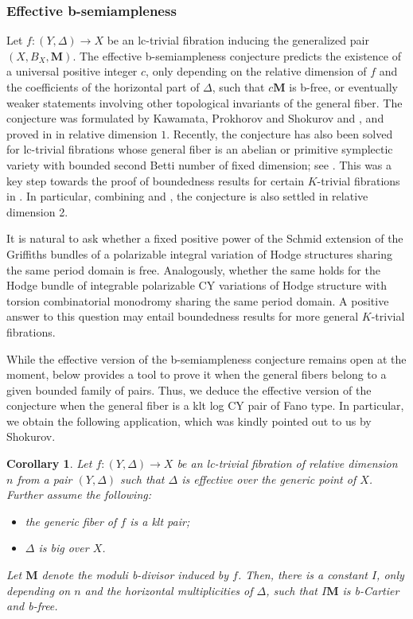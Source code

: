\documentclass{amsart}
\newtheorem{cor}[theorem]{Corollary}
\theoremstyle{definition}
\theoremstyle{remark}
\newcommand\bfM{{\bf M}}
\def\bfM{\mathbf{M}}
\numberwithin{equation}{section}
\begin{document}
\subsubsection{Effective  b-semiampleness}
Let $f \colon (Y, \Delta) \to X$ be an lc-trivial fibration inducing the generalized pair $(X, B_{X}, \bfM)$. The effective  b-semiampleness conjecture predicts the existence of a universal positive integer $c$, only depending on the relative dimension of $f$ and the coefficients of the horizontal part of $\Delta$, such that $c \bfM$ is  b-free, or eventually weaker statements involving other topological invariants of the general fiber. The conjecture was formulated by Kawamata, Prokhorov and Shokurov  \cite[Conj 1]{AmbroPhD} and \cite[Conj.~7.13.1]{PS09}, and proved in \cite[Cor.~8.15]{PS09} in relative dimension $1$.
Recently, the conjecture has also been solved for lc-trivial fibrations whose general fiber is an abelian or primitive symplectic variety with bounded second Betti number of fixed dimension; see \cite[Thm.~C]{EFGMS2025}. This was a key step towards the proof of boundedness results for certain $K$-trivial fibrations in \cite{EFGMS2025}.
In particular, combining \cite{EFGMS2025} and \cite[Thm.~1.4]{babwild}, the conjecture is also settled in relative dimension 2.

It is natural to ask whether a fixed positive power of the Schmid extension of the Griffiths bundles of a polarizable integral variation of Hodge structures sharing the same period domain is free. Analogously, whether the same holds for the Hodge bundle of integrable polarizable CY variations of Hodge structure with torsion combinatorial monodromy sharing the same period domain. A positive answer to this question may entail boundedness results for more general $K$-trivial fibrations.

While the effective version of the b-semiampleness conjecture remains open at the moment,
 below provides a tool to prove it when the general fibers belong to a given bounded family of pairs.
Thus, we deduce the effective version of the conjecture when the general fiber is a klt log CY pair of Fano type.
In particular, we obtain the following application, which was kindly pointed out to us by Shokurov.
\begin{cor}\label{cor:effective_b_semiampleness_fano}
Let $f \colon (Y,\Delta)\to X$ be an lc-trivial fibration of relative dimension $n$ from a pair $(Y,\Delta)$
such that $\Delta$ is effective over the generic point of $X$.
Further assume the following:
\begin{itemize}
    \item[(i)] the generic fiber of $f$ is a klt pair;
    \item[(ii)] $\Delta$ is big over $X$.
\end{itemize}
Let $\bfM$ denote the moduli b-divisor induced by $f$.
Then, there is a constant $I$, only depending on $n$ and the horizontal multiplicities of $\Delta$, such that $I\bfM$ is b-Cartier and b-free.
\end{cor}
\end{document}
